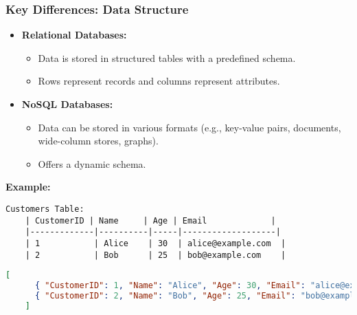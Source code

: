 \documentclass[aspectratio=169]{beamer}
\begin{document}
\begin{frame}
    \frametitle{Key Differences: Data Structure}
    \begin{itemize}
        \item \textbf{Relational Databases:} 
            \begin{itemize}
                \item Data is stored in structured tables with a predefined schema.
                \item Rows represent records and columns represent attributes.
            \end{itemize}
        \item \textbf{NoSQL Databases:} 
            \begin{itemize}
                \item Data can be stored in various formats (e.g., key-value pairs, documents, wide-column stores, graphs).
                \item Offers a dynamic schema.
            \end{itemize}
    \end{itemize}
    \textbf{Example:}  
    \begin{lstlisting}[basicstyle=\footnotesize]
    Customers Table:
    | CustomerID | Name     | Age | Email             |
    |-------------|----------|-----|-------------------|
    | 1           | Alice    | 30  | alice@example.com  |
    | 2           | Bob      | 25  | bob@example.com    |
    \end{lstlisting}
    \begin{lstlisting}[language=json, basicstyle=\footnotesize]
    [
      { "CustomerID": 1, "Name": "Alice", "Age": 30, "Email": "alice@example.com" },
      { "CustomerID": 2, "Name": "Bob", "Age": 25, "Email": "bob@example.com" }
    ]
    \end{lstlisting}
\end{frame}
\end{document}
